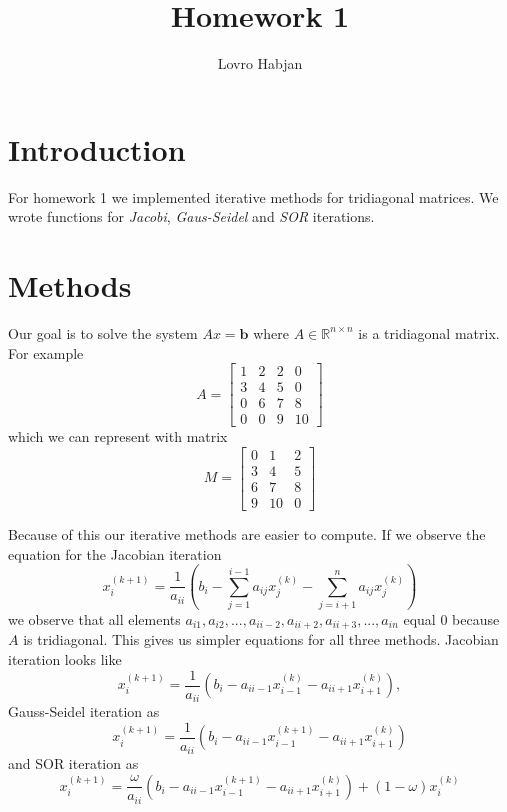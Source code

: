 \documentclass[]{article}
\title{Homework 1}
\author{Lovro Habjan}
\begin{document}
\maketitle


\section{Introduction}

For homework 1 we implemented iterative methods for tridiagonal matrices. We
wrote functions for \textit{Jacobi}, \textit{Gaus-Seidel} and \textit{SOR}
iterations.

\section{Methods}

Our goal is to solve the system $Ax = \mathbf{b}$ where $A \in \mathbb{R}^{n
\times n}$ is a tridiagonal matrix. For example
\begin{equation*}
	A = \begin{bmatrix}
		1 & 2 & 2 & 0 \\
		3 & 4 & 5 & 0 \\
		0 & 6 & 7 & 8 \\
		0 & 0 & 9 & 10
	\end{bmatrix}
\end{equation*}
which we can represent with matrix
\begin{equation*}
	M = \begin{bmatrix}
		0 & 1 & 2 \\
		3 & 4 & 5 \\
		6 & 7 & 8 \\
		9 & 10 & 0
	\end{bmatrix}
\end{equation*}

Because of this our iterative methods are easier to compute. If we observe the
equation for the Jacobian iteration
\begin{equation*}
	x_i^{(k+1)} = \frac{1}{a_{ii}} \left( b_i - \sum_{j = 1}^{i-1} a_{ij}
		x_j^{(k)} - \sum_{j = i + 1}^{n} a_{ij} x_j^{(k)} \right)
\end{equation*}
we observe that all elements $a_{i1}, a_{i2}, ..., a_{i i-2}, a_{i i + 2},
a_{i i + 3}, ..., a_{i n}$ equal 0 because $A$ is tridiagonal. This gives us
simpler equations for all three methods. Jacobian iteration looks like
\begin{equation*}
	x_i^{(k+1)} = \frac{1}{a_{ii}} \left( b_i - a_{i i-1} x_{i-1}^{(k)} -
		a_{i i+1} x_{i+1}^{(k)} \right),
\end{equation*}
Gauss-Seidel iteration as
\begin{equation*}
	x_i^{(k+1)} = \frac{1}{a_{ii}} \left( b_i - a_{i i-1} x_{i-1}^{(k+1)} -
		a_{i i+1} x_{i+1}^{(k)} \right)
\end{equation*}
and SOR iteration as
\begin{equation*}
	x_i^{(k+1)} = \frac{\omega}{a_{ii}} \left( b_i - a_{i i-1} x_{i-1}^{(k+1)} -
		a_{i i+1} x_{i+1}^{(k)} \right) + (1 - \omega) x_i^{(k)}
\end{equation*}
\end{document}
